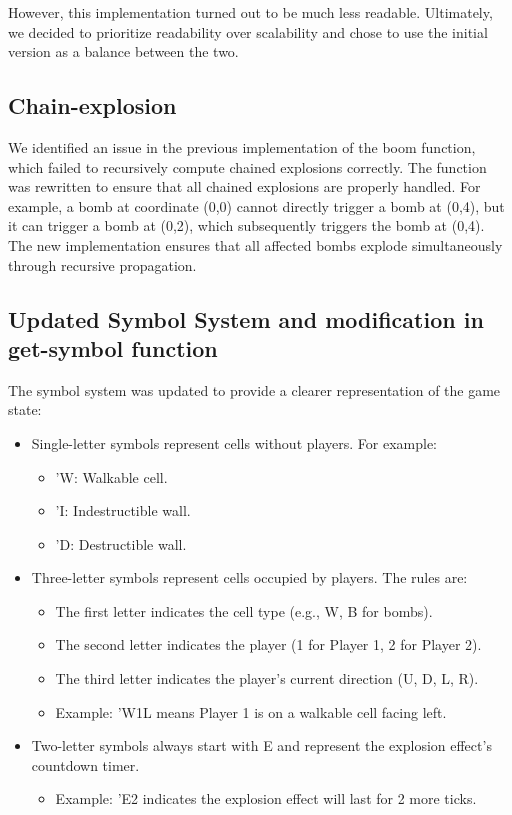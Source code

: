 \documentclass[12pt]{article}
\begin{document}
\indent However, this implementation turned out to be much less readable. Ultimately, we decided to prioritize readability over scalability and chose to use the initial version as a balance between the two.

\subsection*{Chain-explosion}

\hspace*{1.27cm}We identified an issue in the previous implementation of the boom function, which failed to recursively compute chained explosions correctly. The function was rewritten to ensure that all chained explosions are properly handled. For example, a bomb at coordinate (0,0) cannot directly trigger a bomb at (0,4), but it can trigger a bomb at (0,2), which subsequently triggers the bomb at (0,4). The new implementation ensures that all affected bombs explode simultaneously through recursive propagation.


\subsection*{Updated Symbol System and modification in get-symbol function}
\hspace*{1.27cm}The symbol system was updated to provide a clearer representation of the game state:  
\begin{itemize}
  \item Single-letter symbols represent cells without players. For example:
    \begin{itemize}
      \item 'W: Walkable cell.
      \item 'I: Indestructible wall.
      \item 'D: Destructible wall.
    \end{itemize}
  \item Three-letter symbols represent cells occupied by players. The rules are:
    \begin{itemize}
      \item The first letter indicates the cell type (e.g., W, B for bombs).
      \item The second letter indicates the player (1 for Player 1, 2 for Player 2).
      \item The third letter indicates the player's current direction (U, D, L, R).
      \item Example: 'W1L means Player 1 is on a walkable cell facing left.
    \end{itemize}
  \item Two-letter symbols always start with E and represent the explosion effect's countdown timer.
    \begin{itemize}
      \item Example: 'E2 indicates the explosion effect will last for 2 more ticks.
    \end{itemize}
\end{itemize}
\end{document}
